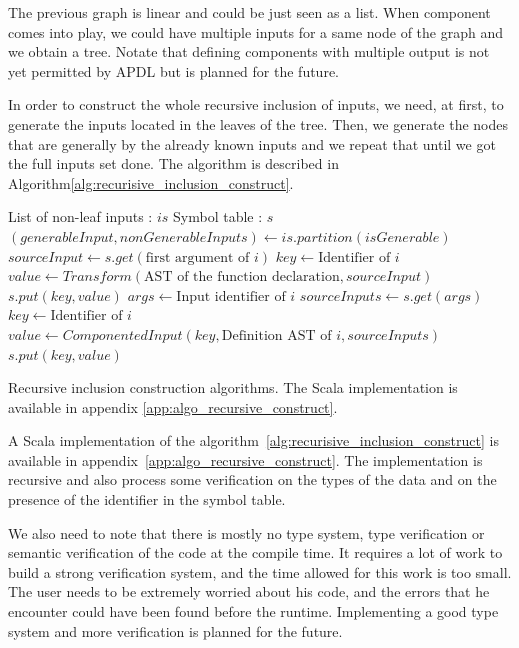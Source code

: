 The previous graph is linear and could be just seen as a list. When component
comes into play, we could have multiple inputs for a same node of the graph and
we obtain a tree. Notate that defining components with multiple output is not yet
permitted by \gls{APDL} but is planned for the future.

In order to construct the whole recursive inclusion of inputs, we need, at first,
to generate the inputs located in the leaves of the tree. Then, we generate
the nodes that are generally by the already known inputs and we repeat that
until we got the full inputs set done. The algorithm is described in
Algorithm\ref{alg:recurisive_inclusion_construct}.

\begin{algorithm}[!htbp]
  \centering
  \begin{algorithmic}[5]
    \State List of non-leaf inputs : $is$
    \State Symbol table : $s$
    \Repeat
    \State $(generableInput,nonGenerableInputs) \gets is.partition(isGenerable)$
    \State $sourceInput \gets s.get(\text{first argument of $i$})$
    \State $key \gets \text{Identifier of $i$}$
    \State $value \gets Transform(\text{AST of the function declaration},sourceInput)$
    \State $s.put(key,value)$
    \EndIf
    \State $args \gets \text{Input identifier of $i$}$
    \State $sourceInputs \gets s.get(args)$
    \State $key \gets \text{Identifier of $i$}$
    \State $value \gets ComponentedInput(key,\text{Definition AST of $i$},sourceInputs)$
    \State $s.put(key,value)$
    \EndIf
    \EndFor
  \end{algorithmic}
  \caption[Recursive inclusion construction]{Recursive inclusion
    construction algorithms. The Scala implementation is available in appendix \ref{app:algo_recursive_construct}.}
  \label{alg:recurisive_inclusion_construct}
\end{algorithm}

A Scala implementation of the algorithm~\ref{alg:recurisive_inclusion_construct}
is available in appendix~\ref{app:algo_recursive_construct}. The implementation
is recursive and also process some verification on the types of the data and on the
presence of the identifier in the symbol table.

We also need to note that there is mostly no type system, type verification or
semantic verification of the code at the compile time. It requires a lot of work
to build a strong verification system, and the time allowed for this work is too
small. The user needs to be extremely worried about his code, and the
errors that he encounter could have been found before the runtime.
Implementing a good type system and more verification is planned for the future.

